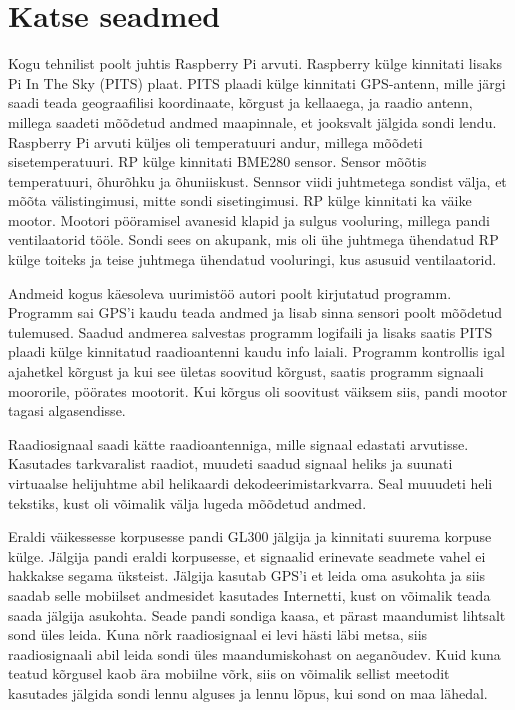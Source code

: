 \documentclass{trkut}%
\begin{document}
\section{Katse seadmed}
Kogu tehnilist poolt juhtis Raspberry Pi arvuti. Raspberry külge kinnitati lisaks Pi In The Sky (PITS) plaat. PITS plaadi külge kinnitati GPS-antenn, mille järgi saadi teada geograafilisi koordinaate, kõrgust ja kellaaega, ja raadio antenn, millega saadeti mõõdetud andmed maapinnale, et jooksvalt jälgida sondi lendu. Raspberry Pi arvuti küljes oli temperatuuri andur, millega mõõdeti sisetemperatuuri. RP külge kinnitati BME280 sensor. Sensor mõõtis temperatuuri, õhurõhku ja õhuniiskust. Sennsor viidi juhtmetega sondist välja, et mõõta välistingimusi, mitte sondi sisetingimusi. RP külge kinnitati ka väike mootor. Mootori pööramisel avanesid klapid ja sulgus vooluring, millega pandi ventilaatorid tööle. Sondi sees on akupank, mis oli ühe juhtmega ühendatud RP külge toiteks ja teise juhtmega ühendatud vooluringi, kus asusuid ventilaatorid.

Andmeid kogus käesoleva uurimistöö autori poolt kirjutatud programm. Programm sai GPS'i kaudu teada andmed ja lisab sinna sensori poolt mõõdetud tulemused. Saadud andmerea salvestas programm logifaili ja lisaks saatis PITS plaadi külge kinnitatud raadioantenni kaudu info laiali. Programm kontrollis igal ajahetkel kõrgust ja kui see ületas soovitud kõrgust, saatis programm signaali moororile, pöörates mootorit. Kui kõrgus oli soovitust väiksem siis, pandi mootor tagasi algasendisse.

Raadiosignaal saadi kätte raadioantenniga, mille signaal edastati arvutisse. Kasutades tarkvaralist raadiot, muudeti saadud signaal heliks ja suunati virtuaalse helijuhtme abil helikaardi dekodeerimistarkvarra. Seal muuudeti heli tekstiks, kust oli võimalik välja lugeda mõõdetud andmed.

Eraldi väikessesse korpusesse pandi GL300 jälgija ja kinnitati suurema korpuse külge. Jälgija pandi eraldi korpusesse, et signaalid erinevate seadmete vahel ei hakkakse segama üksteist. Jälgija kasutab GPS'i et leida oma asukohta ja siis saadab selle mobiilset andmesidet kasutades Internetti, kust on võimalik teada saada jälgija asukohta. Seade pandi sondiga kaasa, et pärast maandumist lihtsalt sond üles leida. Kuna nõrk raadiosignaal ei levi hästi läbi metsa, siis raadiosignaali abil leida sondi üles maandumiskohast on aeganõudev. Kuid kuna teatud kõrgusel kaob ära mobiilne võrk, siis on võimalik sellist meetodit kasutades jälgida sondi lennu alguses ja lennu lõpus, kui sond on maa lähedal.
\end{document}
